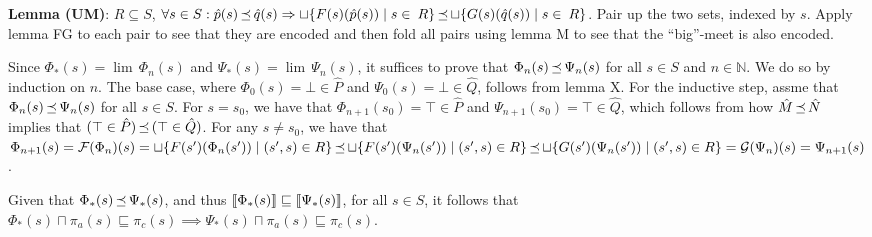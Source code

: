 \textbf{Lemma (UM)}: $R \subseteq S$, $\forall s \in S : \hat p(s) \operatorname{\mathrel{\preceq}} \hat q(s) \Rightarrow \sqcup \{ F(s)(\hat p(s)) \mid s \in \: R \} \operatorname{\mathrel{\preceq}} \sqcup \{ G(s)(\hat q(s)) \mid s \in \: R \}$. Pair up the two sets, indexed by $s$. Apply lemma FG to each pair to see that they are encoded and then fold all pairs using lemma M to see that the ``big''-meet is also encoded.

Since $\Phi_{*}(s) = \lim \, \Phi_{n}(s)$ and $\Psi_{*}(s) = \lim \, \Psi_{n}(s)$, it suffices to prove that $\Phi_{n}(s) \operatorname{\mathrel{\preceq}} \Psi_{n}(s)$ for all $s \in S$ and $n \in \mathbb{N}$. We do so by induction on $n$. The base case, where $\Phi_{0}(s) = \bot \in \hat P$ and $\Psi_{0}(s) = \bot \in \hat Q$, follows from lemma X. For the inductive step, assme that $\Phi_{n}(s) \operatorname{\mathrel{\preceq}} \Psi_{n}(s)$ for all $s \in S$. For $s = s_{0}$, we have that $\Phi_{n+1}(s_{0}) = \top \in \hat P$ and $\Psi_{n+1}(s_{0}) = \top \in \hat Q$, which follows from how $\hat M \operatorname{\mathrel{\preceq}} \hat N$ implies that $(\top \in \hat P) \operatorname{\mathrel{\preceq}} \, (\top \in \hat Q)$. For any $s \neq s_{0}$, we have that $\Phi_{n+1}(s) = \mathcal{F}(\Phi_{n})(s) = \sqcup \{ F(s')(\Phi_{n}(s')) \mid (s',s) \in R \} \operatorname{\mathrel{\preceq}} \sqcup \{ F(s')(\Psi_{n}(s')) \mid (s',s) \in R \} \operatorname{\mathrel{\preceq}} \sqcup \{ G(s')(\Psi_{n}(s')) \mid (s',s) \in R \} = \mathcal{G}(\Psi_{n})(s) = \Psi_{n+1}(s)$.

Given that $\Phi_{*}(s) \operatorname{\mathrel{\preceq}} \Psi_{*}(s)$, and thus $\llbracket\Phi_{*}(s)\rrbracket \sqsubseteq \llbracket\Psi_{*}(s)\rrbracket$, for all $s \in S$, it follows that $\Phi_{*}(s) \sqcap \pi_{a}(s) \sqsubseteq \pi_{c}(s) \implies \Psi_{*}(s) \sqcap \pi_{a}(s) \sqsubseteq \pi_{c}(s)$.

